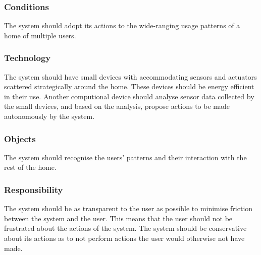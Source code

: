 \subsubsection{Conditions}

The system should adopt its actions to the wide-ranging usage patterns of a home
of multiple users.

\subsubsection{Technology}

The system should have small devices with accommodating sensors and actuators scattered strategically around the home.
These devices should be energy efficient in their use. Another computional
device should analyse sensor data collected by the small devices, and based on
the analysis, propose actions to be made autonomously by the system.

\subsubsection{Objects}

The system should recognise the users' patterns and their interaction with the
rest of the home.

\subsubsection{Responsibility}

The system should be as transparent to the user as possible to minimise friction
between the system and the user. This means that the user should not be
frustrated about the actions of the system. The system should be conservative
about its actions as to not perform actions the user would otherwise not have made.

